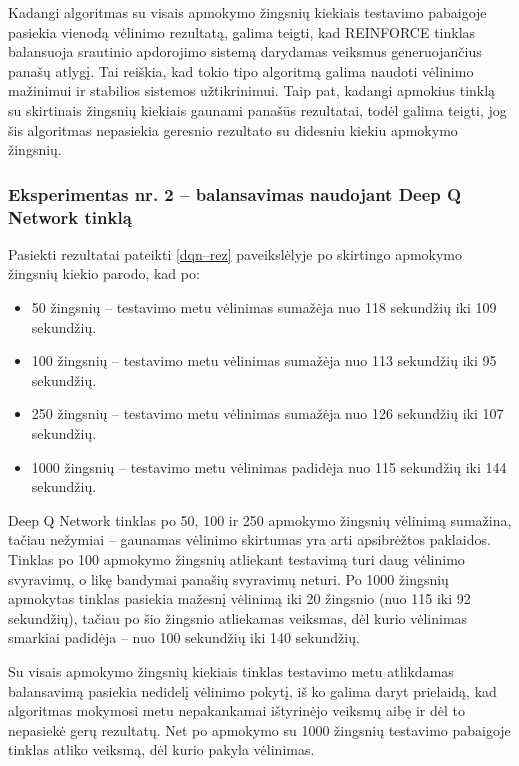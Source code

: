 \documentclass{VUMIFPSbakalaurinis}
\begin{document}
Kadangi algoritmas su visais apmokymo žingsnių kiekiais testavimo pabaigoje pasiekia vienodą vėlinimo rezultatą, galima teigti, kad REINFORCE tinklas balansuoja srautinio apdorojimo sistemą darydamas veiksmus generuojančius panašų atlygį. Tai reiškia, kad tokio tipo algoritmą galima naudoti vėlinimo mažinimui ir stabilios sistemos užtikrinimui. Taip pat, kadangi apmokius tinklą su skirtinais žingsnių kiekiais gaunami panašūs rezultatai, todėl galima teigti, jog šis algoritmas nepasiekia geresnio rezultato su didesniu kiekiu apmokymo žingsnių.

\subsubsection{Eksperimentas nr. 2 – balansavimas naudojant Deep Q Network tinklą}
Pasiekti rezultatai pateikti \ref{dqn–rez} paveikslėlyje po skirtingo apmokymo žingsnių kiekio parodo, kad po:
\begin{itemize}
    \item 50 žingsnių – testavimo metu vėlinimas sumažėja nuo 118 sekundžių iki 109 sekundžių. 
    \item 100 žingsnių – testavimo metu vėlinimas sumažėja nuo 113 sekundžių iki 95 sekundžių.
    \item 250 žingsnių – testavimo metu vėlinimas sumažėja nuo 126 sekundžių iki 107 sekundžių.
    \item 1000 žingsnių – testavimo metu vėlinimas padidėja nuo 115 sekundžių iki 144 sekundžių.
\end{itemize}
Deep Q Network tinklas po 50, 100 ir 250 apmokymo žingsnių vėlinimą sumažina, tačiau nežymiai – gaunamas vėlinimo skirtumas yra arti apsibrėžtos paklaidos. Tinklas po 100 apmokymo žingsnių atliekant testavimą turi daug vėlinimo svyravimų, o likę bandymai panašių svyravimų neturi. Po 1000 žingsnių apmokytas tinklas pasiekia mažesnį vėlinimą iki 20 žingsnio (nuo 115 iki 92 sekundžių), tačiau po šio žingsnio atliekamas veiksmas, dėl kurio vėlinimas smarkiai padidėja – nuo 100 sekundžių iki 140 sekundžių.

Su visais apmokymo žingsnių kiekiais tinklas testavimo metu atlikdamas balansavimą pasiekia nedidelį vėlinimo pokytį,  iš ko galima daryt prielaidą, kad algoritmas mokymosi metu nepakankamai ištyrinėjo veiksmų aibę ir dėl to nepasiekė gerų rezultatų. Net po apmokymo su 1000 žingsnių testavimo pabaigoje tinklas atliko veiksmą, dėl kurio pakyla vėlinimas.
\end{document}
